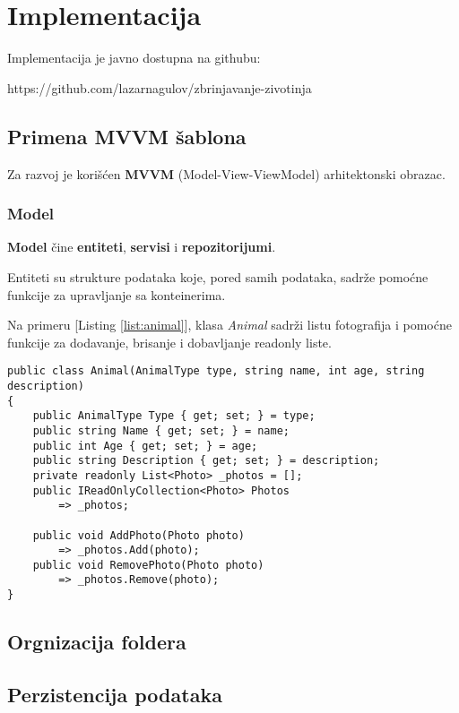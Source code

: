 \section{Implementacija}
\par Implementacija je javno dostupna na githubu: 
\begin{center}
    https://github.com/lazarnagulov/zbrinjavanje-zivotinja
\end{center}
\subsection{Primena MVVM šablona}
\par Za razvoj je korišćen \textbf{MVVM} (Model-View-ViewModel) arhitektonski obrazac. 
\subsubsection*{Model}
\par \textbf{Model} čine \textbf{entiteti}, \textbf{servisi} i \textbf{repozitorijumi}. 
\par Entiteti su strukture podataka koje, pored samih podataka, sadrže pomoćne funkcije za upravljanje sa konteinerima. 
\par Na primeru [Listing \ref{list:animal}], klasa \textit{Animal} sadrži listu fotografija i pomoćne funkcije za dodavanje, brisanje i dobavljanje
readonly liste.
\begin{lstlisting}[caption={Primer entiteta}, captionpos=b, label=list:animal]
public class Animal(AnimalType type, string name, int age, string description)
{
    public AnimalType Type { get; set; } = type;
    public string Name { get; set; } = name;
    public int Age { get; set; } = age;
    public string Description { get; set; } = description;
    private readonly List<Photo> _photos = [];
    public IReadOnlyCollection<Photo> Photos 
        => _photos;

    public void AddPhoto(Photo photo) 
        => _photos.Add(photo);
    public void RemovePhoto(Photo photo) 
        => _photos.Remove(photo);
}
\end{lstlisting}
\subsection{Orgnizacija foldera}
\subsection{Perzistencija podataka}
